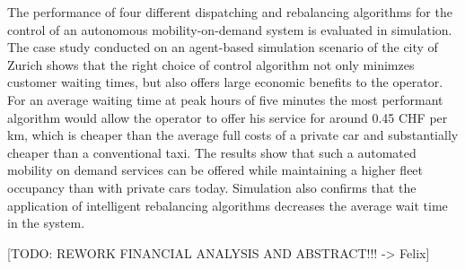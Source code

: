 The performance of four different dispatching and rebalancing algorithms for the
control of an autonomous mobility-on-demand system is evaluated in simulation.
The case study conducted on an agent-based simulation scenario of the city of Zurich
shows that the right choice of control algorithm not only minimzes customer waiting
times, but also offers large economic benefits to the operator. For an average
waiting time at peak hours of five minutes the most performant algorithm would allow
the operator to offer his service for around 0.45 CHF per km, which is cheaper than
the average full costs of a private car and substantially cheaper than a conventional
taxi. The results show that such a automated mobility on demand services can be offered
while maintaining a higher fleet occupancy than with private cars today. Simulation
also confirms that the application of intelligent rebalancing algorithms decreases
the average wait time in the system.

[TODO: REWORK FINANCIAL ANALYSIS AND ABSTRACT!!! -> Felix]
